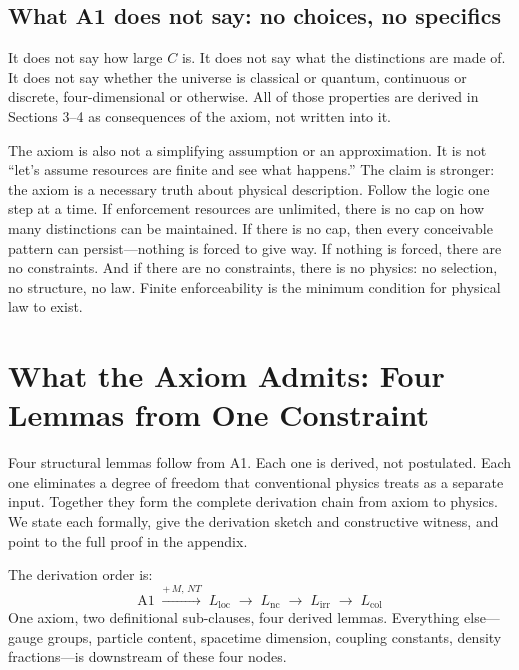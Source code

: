 \documentclass[11pt]{article}
\begin{document}
\subsection{What A1 does not say: no choices, no specifics}

It does not say how large $C$ is.  It does not say what the distinctions are made of.  It does not say whether the universe is classical or quantum, continuous or discrete, four-dimensional or otherwise.  All of those properties are derived in Sections 3--4 as consequences of the axiom, not written into it.

The axiom is also not a simplifying assumption or an approximation.  It is not ``let's assume resources are finite and see what happens.''  The claim is stronger: the axiom is a necessary truth about physical description.  Follow the logic one step at a time.  If enforcement resources are unlimited, there is no cap on how many distinctions can be maintained.  If there is no cap, then every conceivable pattern can persist---nothing is forced to give way.  If nothing is forced, there are no constraints.  And if there are no constraints, there is no physics: no selection, no structure, no law.  Finite enforceability is the minimum condition for physical law to exist.


\section{What the Axiom Admits: Four Lemmas from One Constraint}

Four structural lemmas follow from A1.  Each one is derived, not postulated.  Each one eliminates a degree of freedom that conventional physics treats as a separate input.  Together they form the complete derivation chain from axiom to physics.  We state each formally, give the derivation sketch and constructive witness, and point to the full proof in the appendix.

The derivation order is:
\begin{equation}
\text{A1} \;\xrightarrow{+\,M,\,NT}\; L_{\mathrm{loc}} \;\longrightarrow\; L_{\mathrm{nc}} \;\longrightarrow\; L_{\mathrm{irr}} \;\longrightarrow\; L_{\mathrm{col}}
\end{equation}
One axiom, two definitional sub-clauses, four derived lemmas.  Everything else---gauge groups, particle content, spacetime dimension, coupling constants, density fractions---is downstream of these four nodes.
\end{document}
